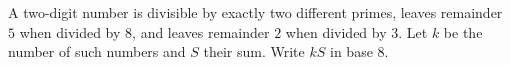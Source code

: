 A two-digit number is divisible by exactly two different primes, leaves remainder $5$ when divided by $8$, and leaves remainder $2$ when divided by $3$. Let $k$ be the number of such numbers and $S$ their sum. Write $kS$ in base $8$.
